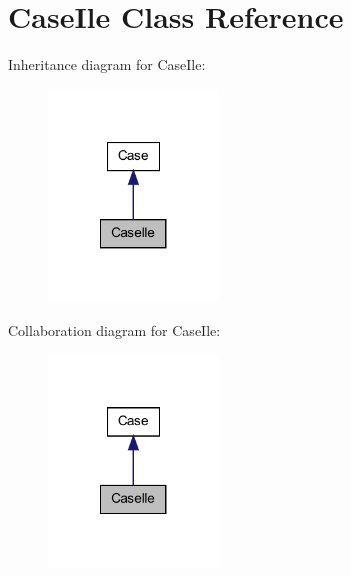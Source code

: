\hypertarget{class_case_ile}{
\section{CaseIle Class Reference}
\label{class_case_ile}
}


Inheritance diagram for CaseIle:
\nopagebreak
\begin{figure}[H]
\begin{center}
\leavevmode
\includegraphics[width=128pt]{class_case_ile__inherit__graph}
\end{center}
\end{figure}


Collaboration diagram for CaseIle:
\nopagebreak
\begin{figure}[H]
\begin{center}
\leavevmode
\includegraphics[width=128pt]{class_case_ile__coll__graph}
\end{center}
\end{figure}
